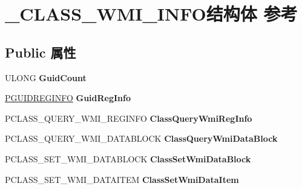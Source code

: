 \hypertarget{struct___c_l_a_s_s___w_m_i___i_n_f_o}{}\section{\+\_\+\+C\+L\+A\+S\+S\+\_\+\+W\+M\+I\+\_\+\+I\+N\+F\+O结构体 参考}
\label{struct___c_l_a_s_s___w_m_i___i_n_f_o}
\subsection*{Public 属性}
\begin{DoxyCompactItemize}
\item 
\mbox{\label{struct___c_l_a_s_s___w_m_i___i_n_f_o_a07c52fe36855813145af6a1c6721e5d3}} 
U\+L\+O\+NG {\bfseries Guid\+Count}
\item 
\mbox{\label{struct___c_l_a_s_s___w_m_i___i_n_f_o_acbd2cfd9d75d5b4b6cedf669c668fca6}} 
\hyperlink{struct_g_u_i_d_r_e_g_i_n_f_o}{P\+G\+U\+I\+D\+R\+E\+G\+I\+N\+FO} {\bfseries Guid\+Reg\+Info}
\item 
\mbox{\label{struct___c_l_a_s_s___w_m_i___i_n_f_o_aff3bc20ecb73c8d7c22bbdf8feac93f5}} 
P\+C\+L\+A\+S\+S\+\_\+\+Q\+U\+E\+R\+Y\+\_\+\+W\+M\+I\+\_\+\+R\+E\+G\+I\+N\+FO {\bfseries Class\+Query\+Wmi\+Reg\+Info}
\item 
\mbox{\label{struct___c_l_a_s_s___w_m_i___i_n_f_o_ae701a4baf5198b035ffae533c9d842cd}} 
P\+C\+L\+A\+S\+S\+\_\+\+Q\+U\+E\+R\+Y\+\_\+\+W\+M\+I\+\_\+\+D\+A\+T\+A\+B\+L\+O\+CK {\bfseries Class\+Query\+Wmi\+Data\+Block}
\item 
\mbox{\label{struct___c_l_a_s_s___w_m_i___i_n_f_o_abda45cb15cb173d8e307eb8a2797a461}} 
P\+C\+L\+A\+S\+S\+\_\+\+S\+E\+T\+\_\+\+W\+M\+I\+\_\+\+D\+A\+T\+A\+B\+L\+O\+CK {\bfseries Class\+Set\+Wmi\+Data\+Block}
\item 
\mbox{\label{struct___c_l_a_s_s___w_m_i___i_n_f_o_a7154256254959c591d46a68acd997898}} 
P\+C\+L\+A\+S\+S\+\_\+\+S\+E\+T\+\_\+\+W\+M\+I\+\_\+\+D\+A\+T\+A\+I\+T\+EM {\bfseries Class\+Set\+Wmi\+Data\+Item}

\end{DoxyCompactItemize}

